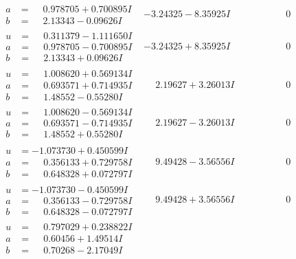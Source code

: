 \documentclass[1p]{elsarticle_modified}
\theoremstyle{definition}
\begin{document}
$$\begin{array}{c|c|c}
\begin{aligned}
a &= \phantom{-}0.978705 + 0.700895 I \\
b &= \phantom{-}2.13343 - 0.09626 I\end{aligned}
 & -3.24325 - 8.35925 I & \phantom{-0.000000 } 0 \\ \hline\begin{aligned}
u &= \phantom{-}0.311379 - 1.111650 I \\
a &= \phantom{-}0.978705 - 0.700895 I \\
b &= \phantom{-}2.13343 + 0.09626 I\end{aligned}
 & -3.24325 + 8.35925 I & \phantom{-0.000000 } 0 \\ \hline\begin{aligned}
u &= \phantom{-}1.008620 + 0.569134 I \\
a &= \phantom{-}0.693571 + 0.714935 I \\
b &= \phantom{-}1.48552 - 0.55280 I\end{aligned}
 & \phantom{-}2.19627 + 3.26013 I & \phantom{-0.000000 } 0 \\ \hline\begin{aligned}
u &= \phantom{-}1.008620 - 0.569134 I \\
a &= \phantom{-}0.693571 - 0.714935 I \\
b &= \phantom{-}1.48552 + 0.55280 I\end{aligned}
 & \phantom{-}2.19627 - 3.26013 I & \phantom{-0.000000 } 0 \\ \hline\begin{aligned}
u &= -1.073730 + 0.450599 I \\
a &= \phantom{-}0.356133 + 0.729758 I \\
b &= \phantom{-}0.648328 + 0.072797 I\end{aligned}
 & \phantom{-}9.49428 - 3.56556 I & \phantom{-0.000000 } 0 \\ \hline\begin{aligned}
u &= -1.073730 - 0.450599 I \\
a &= \phantom{-}0.356133 - 0.729758 I \\
b &= \phantom{-}0.648328 - 0.072797 I\end{aligned}
 & \phantom{-}9.49428 + 3.56556 I & \phantom{-0.000000 } 0 \\ \hline\begin{aligned}
u &= \phantom{-}0.797029 + 0.238822 I \\
a &= \phantom{-}0.60456 + 1.49514 I \\
b &= \phantom{-}0.70268 - 2.17049 I\end{aligned}

\end{array}$$
\end{document}
